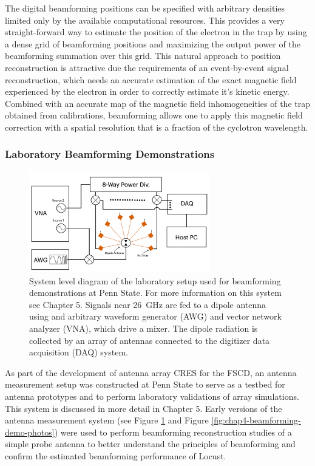 The digital beamforming positions can be specified with arbitrary densities limited only by the available computational resources. This provides a very straight-forward way to estimate the position of the electron in the trap by using a dense grid of beamforming positions and maximizing the output power of the beamforming summation over this grid. This natural approach to position reconstruction is attractive due the requirements of an event-by-event signal reconstruction, which needs an accurate estimation of the exact magnetic field experienced by the electron in order to correctly estimate it's kinetic energy. Combined with an accurate map of the magnetic field inhomogeneities of the trap obtained from calibrations, beamforming allows one to apply this magnetic field correction with a spatial resolution that is a fraction of the cyclotron wavelength.

\subsubsection*{Laboratory Beamforming Demonstrations}

\begin{figure}[htbp]
    \centering
    \includegraphics*[width=0.7\textwidth]{figs/Chapter-4/230725_beamforming_setup_diagram.png}
    \caption{\label{fig:chap4-beamforming-demo-system}System level diagram of the laboratory setup used for beamforming demonstrations at Penn State. For more information on this system see Chapter 5. Signals near 26~GHz are fed to a dipole antenna using and arbitrary waveform generator (AWG) and vector network analyzer (VNA), which drive a mixer. The dipole radiation is collected by an array of antennas connected to the digitizer data acquisition (DAQ) system.}
\end{figure}

As part of the development of antenna array CRES for the FSCD, an antenna measurement setup was constructed at Penn State to serve as a testbed for antenna prototypes and to perform laboratory validations of array simulations. This system is discussed in more detail in Chapter 5. Early versions of the antenna measurement system (see Figure \ref{fig:chap4-beamforming-demo-system} and Figure \ref{fig:chap4-beamforming-demo-photos}) were used to perform beamforming reconstruction studies of a simple probe antenna to better understand the principles of beamforming and confirm the estimated beamforming performance of Locust.

